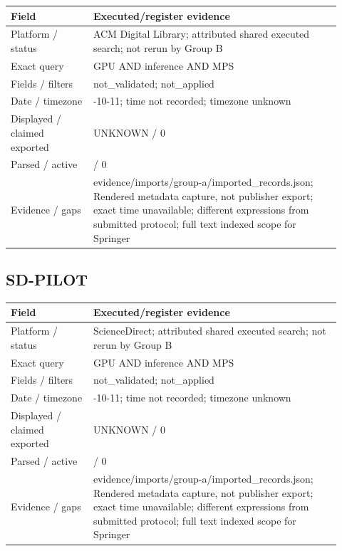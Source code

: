 \documentclass[12pt,a4paper]{article}
\begin{document}
{\small\begin{longtable}{>{\raggedright\arraybackslash}p{0.23\linewidth}>{\raggedright\arraybackslash}p{0.69\linewidth}}
\toprule
Field & Executed/\allowbreak{}register evidence\\\midrule
\endhead
Platform /\allowbreak{} status & ACM Digital Library; attributed shared executed search; not rerun by Group B\\
Exact query & GPU AND inference AND MPS\\
Fields /\allowbreak{} filters & not\_\allowbreak{}validated; not\_\allowbreak{}applied\\
Date /\allowbreak{} timezone & 2026-10-11; time not recorded; timezone unknown\\
Displayed /\allowbreak{} claimed exported & UNKNOWN /\allowbreak{} 0\\
Parsed /\allowbreak{} active & 0 /\allowbreak{} 0\\
Evidence /\allowbreak{} gaps & evidence/\allowbreak{}imports/\allowbreak{}group-a/\allowbreak{}imported\_\allowbreak{}records.json; Rendered metadata capture, not publisher export; exact time unavailable; different expressions from submitted protocol; full text indexed scope for Springer\\
\bottomrule
\end{longtable}}

\subsection*{SD-PILOT}

{\small\begin{longtable}{>{\raggedright\arraybackslash}p{0.23\linewidth}>{\raggedright\arraybackslash}p{0.69\linewidth}}
\toprule
Field & Executed/\allowbreak{}register evidence\\\midrule
\endhead
Platform /\allowbreak{} status & ScienceDirect; attributed shared executed search; not rerun by Group B\\
Exact query & GPU AND inference AND MPS\\
Fields /\allowbreak{} filters & not\_\allowbreak{}validated; not\_\allowbreak{}applied\\
Date /\allowbreak{} timezone & 2026-10-11; time not recorded; timezone unknown\\
Displayed /\allowbreak{} claimed exported & UNKNOWN /\allowbreak{} 0\\
Parsed /\allowbreak{} active & 0 /\allowbreak{} 0\\
Evidence /\allowbreak{} gaps & evidence/\allowbreak{}imports/\allowbreak{}group-a/\allowbreak{}imported\_\allowbreak{}records.json; Rendered metadata capture, not publisher export; exact time unavailable; different expressions from submitted protocol; full text indexed scope for Springer\\
\bottomrule
\end{longtable}}
\end{document}
